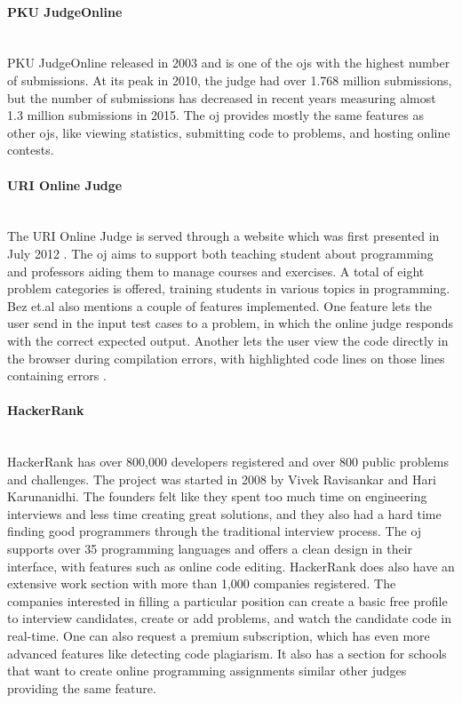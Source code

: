 \paragraph*{PKU JudgeOnline} \hfill \\
PKU JudgeOnline \cite{PKU} released in 2003 and is one of the \glspl{oj} with the highest number of submissions. At its peak in 2010, the judge had over 1.768 million submissions, but the number of submissions has decreased in recent years measuring almost 1.3 million submissions in 2015. The \gls{oj} provides mostly the same features as other \glspl{oj}, like viewing statistics, submitting code to problems, and hosting online contests.

\paragraph*{URI Online Judge} \hfill \\
The URI Online Judge is served through a website which was first presented in July 2012 \cite{a:Bez2013}. The \gls{oj} aims to support both teaching student about programming and professors aiding them to manage courses and exercises. A total of eight problem categories is offered, training students in various topics in programming. Bez et.al also mentions a couple of features implemented. One feature lets the user send in the input test cases to a problem, in which the online judge responds with the correct expected output. Another lets the user view the code directly in the browser during compilation errors, with highlighted code lines on those lines containing errors \cite{a:Bez2013}.

\paragraph*{HackerRank} \hfill \\
HackerRank \cite{HACKERRANK} has over 800,000 developers registered and over 800 public problems and challenges. The project was started in 2008 by Vivek Ravisankar and Hari Karunanidhi. The founders felt like they spent too much time on engineering interviews and less time creating great solutions, and they also had a hard time finding good programmers through the traditional interview process. The \gls{oj} supports over 35 programming languages and offers a clean design in their interface, with features such as online code editing. HackerRank does also have an extensive work section with more than 1,000 companies registered. The companies interested in filling a particular position can create a basic free profile to interview candidates, create or add problems, and watch the candidate code in real-time. One can also request a premium subscription, which has even more advanced features like detecting code plagiarism. It also has a section for schools that want to create online programming assignments similar other judges providing the same feature.

